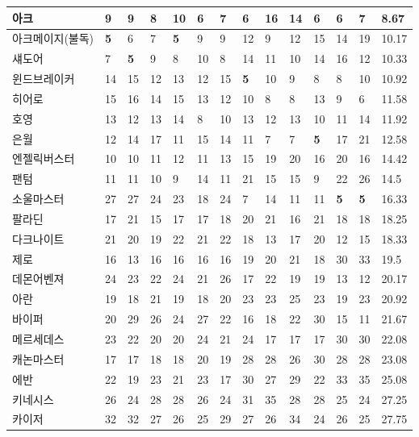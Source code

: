 \documentclass[
]{article}
\begin{document}
\begin{table}[H]
{\begin{tabular}{l|l|l|l|l|l|l|l|l|l|l|l|l|l}
\hline
아크 & 9 & 9 & 8 & 10 & 6 & 7 & 6 & 16 & 14 & 6 & 6 & 7 & 8.67\\
\hline
아크메이지(불독) & \textbf{5} & 6 & 7 & \textbf{5} & 9 & 9 & 12 & 9 & 12 & 15 & 14 & 19 & 10.17\\
\hline
섀도어 & 7 & \textbf{5} & 9 & 8 & 10 & 8 & 14 & 11 & 10 & 14 & 16 & 12 & 10.33\\
\hline
윈드브레이커 & 14 & 15 & 12 & 13 & 12 & 15 & \textbf{5} & 10 & 9 & 8 & 8 & 10 & 10.92\\
\hline
히어로 & 15 & 16 & 14 & 15 & 13 & 12 & 10 & 8 & 8 & 13 & 9 & 6 & 11.58\\
\hline
호영 & 13 & 12 & 13 & 14 & 8 & 10 & 13 & 12 & 13 & 10 & 11 & 14 & 11.92\\
\hline
은월 & 12 & 14 & 17 & 11 & 15 & 14 & 11 & 7 & 7 & \textbf{5} & 17 & 21 & 12.58\\
\hline
엔젤릭버스터 & 10 & 10 & 11 & 12 & 11 & 13 & 15 & 19 & 20 & 16 & 20 & 16 & 14.42\\
\hline
팬텀 & 11 & 11 & 10 & 9 & 14 & 11 & 21 & 15 & 15 & 9 & 22 & 26 & 14.5\\
\hline
소울마스터 & 27 & 27 & 24 & 23 & 18 & 24 & 7 & 14 & 11 & 11 & \textbf{5} & \textbf{5} & 16.33\\
\hline
팔라딘 & 17 & 21 & 15 & 17 & 17 & 18 & 20 & 21 & 16 & 21 & 18 & 18 & 18.25\\
\hline
다크나이트 & 21 & 20 & 19 & 22 & 21 & 22 & 18 & 13 & 17 & 20 & 12 & 15 & 18.33\\
\hline
제로 & 16 & 13 & 16 & 16 & 16 & 16 & 19 & 20 & 21 & 18 & 30 & 33 & 19.5\\
\hline
데몬어벤져 & 24 & 23 & 22 & 24 & 21 & 26 & 17 & 22 & 19 & 19 & 13 & 12 & 20.17\\
\hline
아란 & 19 & 18 & 21 & 19 & 18 & 20 & 23 & 23 & 25 & 23 & 19 & 23 & 20.92\\
\hline
바이퍼 & 20 & 29 & 26 & 24 & 27 & 22 & 16 & 18 & 22 & 30 & 15 & 11 & 21.67\\
\hline
메르세데스 & 23 & 22 & 20 & 20 & 24 & 21 & 24 & 17 & 17 & 17 & 30 & 30 & 22.08\\
\hline
캐논마스터 & 17 & 17 & 18 & 18 & 20 & 19 & 28 & 28 & 26 & 30 & 28 & 28 & 23.08\\
\hline
에반 & 22 & 19 & 23 & 21 & 23 & 17 & 30 & 27 & 29 & 22 & 33 & 35 & 25.08\\
\hline
키네시스 & 26 & 24 & 28 & 28 & 26 & 24 & 31 & 35 & 28 & 28 & 25 & 24 & 27.25\\
\hline
카이저 & 32 & 32 & 27 & 26 & 25 & 29 & 27 & 26 & 34 & 24 & 26 & 25 & 27.75\\

\end{tabular}}
\end{table}
\end{document}
